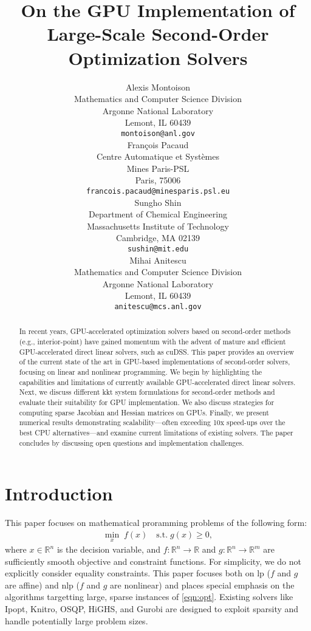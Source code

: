 \documentclass{article}
\title{On the GPU Implementation of Large-Scale Second-Order Optimization Solvers}
\author{%
  Alexis Montoison\\
  Mathematics and Computer Science Division\\
  Argonne National Laboratory\\
  Lemont, IL 60439\\
  \texttt{montoison@anl.gov}\\
  \And
  Fran\c{c}ois Pacaud\\
  Centre Automatique et Systèmes\\
  Mines Paris-PSL\\
  Paris, 75006 \\
  \texttt{francois.pacaud@minesparis.psl.eu}\\
  \And
  Sungho Shin\\
  Department of Chemical Engineering\\
  Massachusetts Institute of Technology\\
  Cambridge, MA 02139\\
  \texttt{sushin@mit.edu}\\
  \And
  Mihai Anitescu\\
  Mathematics and Computer Science Division\\
  Argonne National Laboratory\\
  Lemont, IL 60439\\
  \texttt{anitescu@mcs.anl.gov}\\
}
\begin{document}
\maketitle


\begin{abstract}
In recent years, GPU-accelerated optimization solvers based on second-order methods (e.g., interior-point) have gained momentum with the advent of mature and efficient GPU-accelerated direct linear solvers, such as cuDSS. This paper provides an overview of the current state of the art in GPU-based implementations of second-order solvers, focusing on linear and nonlinear programming. We begin by highlighting the capabilities and limitations of currently available GPU-accelerated direct linear solvers. Next, we discuss different \gls*{kkt} system formulations for second-order methods and evaluate their suitability for GPU implementation. We also discuss strategies for computing sparse Jacobian and Hessian matrices on GPUs. Finally, we present numerical results demonstrating scalability—often exceeding 10x speed-ups over the best CPU alternatives—and examine current limitations of existing solvers. The paper concludes by discussing open questions and implementation challenges.
\end{abstract}


\section{Introduction}\label{eqn:intro}
This paper focuses on mathematical proramming problems of the following form:
\begin{align}\label{eqn:opt}
  \min_{x } \; f(x) \quad \text{s.t.} \; g(x) \geq 0,
\end{align}
where \(x \in \mathbb{R}^n\) is the decision variable, and \(f: \mathbb{R}^n \to \mathbb{R}\) and \(g: \mathbb{R}^n \to \mathbb{R}^m\) are sufficiently smooth objective and constraint functions.
For simplicity, we do not explicitly consider equality constraints.
This paper focuses both on \gls*{lp} ($f$ and $g$ are affine) and \gls*{nlp} ($f$ and $g$ are nonlinear) and places special emphasis on the algorithms targetting large, sparse instances of \cref{eqn:opt}.
Existing solvers like Ipopt, Knitro, OSQP, HiGHS, and Gurobi are designed to exploit sparsity and handle potentially large problem sizes.
\end{document}
